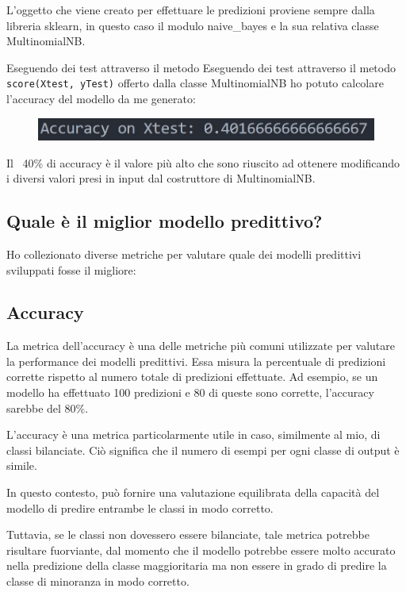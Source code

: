 L’oggetto che viene creato per effettuare le predizioni proviene sempre dalla libreria sklearn, in questo caso il modulo naive\_bayes e la sua relativa classe MultinomialNB.

Eseguendo dei test attraverso il metodo Eseguendo dei test attraverso il metodo \mintinline[bgcolor=bg]
{python}{score(Xtest, yTest)} offerto dalla classe MultinomialNB ho potuto calcolare l’accuracy del modello da me generato:

\begin{figure}
    \begin{center}    
        \includegraphics[width=0.9\linewidth]{images/image41.jpeg}
    \end{center}
\end{figure}

Il ~40\% di accuracy è il valore più alto che sono riuscito ad ottenere modificando i diversi valori presi in input dal costruttore di MultinomialNB.

\subsection{Quale è il miglior modello predittivo?}
Ho collezionato diverse metriche per valutare quale dei modelli predittivi sviluppati fosse il migliore: 
\subsection{Accuracy}
La metrica dell'accuracy è una delle metriche più comuni utilizzate per valutare la performance dei modelli predittivi. Essa misura la percentuale di predizioni corrette rispetto al numero totale di predizioni effettuate. Ad esempio, se un modello ha effettuato 100 predizioni e 80 di queste sono corrette, l'accuracy sarebbe del 80\%.

L'accuracy è una metrica particolarmente utile in caso, similmente al mio, di classi bilanciate. Ciò significa che il numero di esempi per ogni classe di output è simile. 

In questo contesto, può fornire una valutazione equilibrata della capacità del modello di predire entrambe le classi in modo corretto. 

Tuttavia, se le classi  non dovessero essere bilanciate, tale metrica potrebbe risultare fuorviante, dal momento che il modello potrebbe essere molto accurato nella predizione della classe maggioritaria ma non essere in grado di predire la classe di minoranza in modo corretto.

